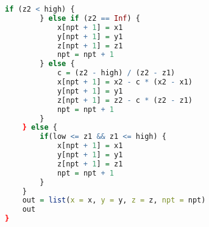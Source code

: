 \begin{lstlisting}[language = R]
        if (z2 < high) {
        } else if (z2 == Inf) {
            x[npt + 1] = x1
            y[npt + 1] = y1
            z[npt + 1] = z1
            npt = npt + 1
        } else {
            c = (z2 - high) / (z2 - z1)
            x[npt + 1] = x2 - c * (x2 - x1)
            y[npt + 1] = y1
            z[npt + 1] = z2 - c * (z2 - z1)
            npt = npt + 1
        }
    } else {
        if(low <= z1 && z1 <= high) {
            x[npt + 1] = x1
            y[npt + 1] = y1
            z[npt + 1] = z1
            npt = npt + 1
        }
    }
    out = list(x = x, y = y, z = z, npt = npt)
    out
}

\end{lstlisting}


